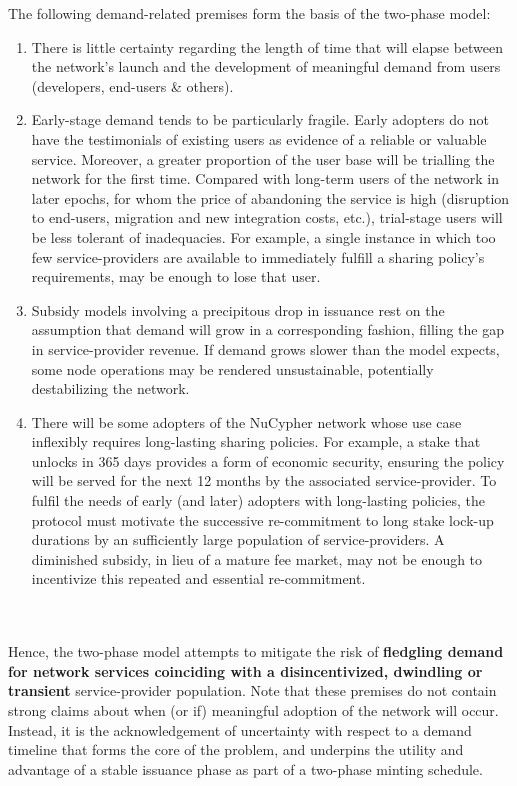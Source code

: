 \documentclass[longbibliography,nofootinbib]{revtex4-1}
\begin{document}
The following demand-related premises form the basis of the two-phase model: 
\begin{enumerate}
\item There is little certainty regarding the length of time that will elapse between the network's launch and the development of meaningful demand from users (developers, end-users \& others).
\item Early-stage demand tends to be particularly fragile. Early adopters do not have the testimonials of existing users as evidence of a reliable or valuable service. Moreover, a greater proportion of the user base will be trialling the network for the first time. Compared with long-term users of the network in later epochs, for whom the price of abandoning the service is high (disruption to end-users, migration and new integration costs, etc.), trial-stage users will be less tolerant of inadequacies. For example, a single instance in which too few service-providers are available to immediately fulfill a sharing policy's requirements, may be enough to lose that user.
\item Subsidy models involving a precipitous drop in issuance rest on the assumption that demand will grow in a corresponding fashion, filling the gap in service-provider revenue. If demand grows slower than the model expects, some node operations may be rendered unsustainable, potentially destabilizing the network.
\item There will be some adopters of the NuCypher network whose use case inflexibly requires long-lasting sharing policies. For example, a stake that unlocks in 365 days provides a form of economic security, ensuring the policy will be served for the next 12 months by the associated service-provider. To fulfil the needs of early (and later) adopters with long-lasting policies, the protocol must motivate the successive re-commitment to long stake lock-up durations by an sufficiently large population of service-providers. A diminished subsidy, in lieu of a mature fee market, may not be enough to incentivize this repeated and essential re-commitment. 
\end{enumerate}

\\\\
Hence, the two-phase model attempts to mitigate the risk of \textbf{fledgling demand for network services coinciding with a disincentivized, dwindling or transient} service-provider population. Note that these premises do not contain strong claims about when (or if) meaningful adoption of the network  will occur. Instead, it is the acknowledgement of uncertainty with respect to a demand timeline that forms the core of the problem, and underpins the utility and advantage of a stable issuance phase as part of a two-phase minting schedule. 
\end{document}
